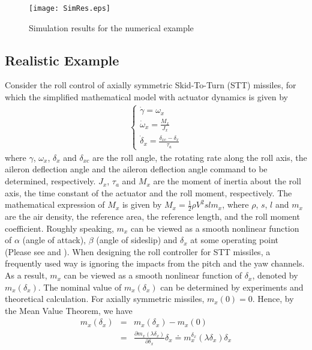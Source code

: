 \documentclass{tSYS2e}
\theoremstyle{plain}
\theoremstyle{definition}
\begin{document}
\begin{figure}[!htb]
  \centering
  \texttt{[image: SimRes.eps]}
  \caption{Simulation results for the numerical example}
  \label{fig1}
\end{figure}

\subsection{Realistic Example}

Consider the roll control of axially symmetric Skid-To-Turn (STT)
missiles, for which the simplified mathematical model with actuator dynamics is given by
\begin{eqnarray}
\left\{
\begin{array}{l}
\dot{\gamma}=\omega _{x} \\
\dot{\omega}_{x}=\frac{M_{x}}{J_{x}} \\
\dot{\delta}_{x}=\frac{\delta _{xc}-\delta _{x}}{\tau_a}
\end{array}
\right.  \label{STT}
\end{eqnarray}
where $\gamma$, $\omega _{x}$, $\delta _{x}$ and $\delta _{xc}$ are the roll angle, the rotating rate along the
roll axis, the aileron deflection angle and the aileron deflection angle
command to be determined, respectively. $J_{x}$, $\tau_a$ and $M_{x}$ are the moment of inertia about the roll axis, the time constant of the actuator and the roll moment, respectively. The mathematical expression of $M_{x}$ is given
by $M_{x}=\frac{1}{2}\rho V^{2}slm_{x}$, where $\rho$, $s$, $l$ and $m_{x}$ are the air density, the reference area, the reference length, and  the roll
moment coefficient. Roughly speaking, $m_{x}$ can be viewed as a smooth
nonlinear function of $\alpha$ (angle of attack), $\beta $ (angle of sideslip) and $\delta_{x}$ at some operating point
(Please see \cite{Siouris2004} and \cite{Hou2013}). When designing the roll controller for STT missiles, a
frequently used way is ignoring the impacts from the pitch and the yaw
channels. As a result, $m_{x}$ can be viewed as a smooth nonlinear function of $
\delta_{x}$, denoted by $m_{x}(\delta _{x})$. The nominal value of $
m_{x}(\delta _{x})$ can be determined by experiments and theoretical
calculation. For axially symmetric missiles, $m_{x}(0)=0$. Hence, by the
Mean Value Theorem, we have
\begin{eqnarray}
m_{x}(\delta _{x})&=&m_{x}(\delta _{x})-m_{x}(0)\nonumber \\
&=&\frac{\partial m_{x}(\lambda
\delta _{x})}{\partial \delta _{x}}\delta _{x}\doteq m_{x}^{\delta _{x}}(\lambda
\delta _{x})\delta _{x}  \label{Coefficient}
\end{eqnarray}
\end{document}
